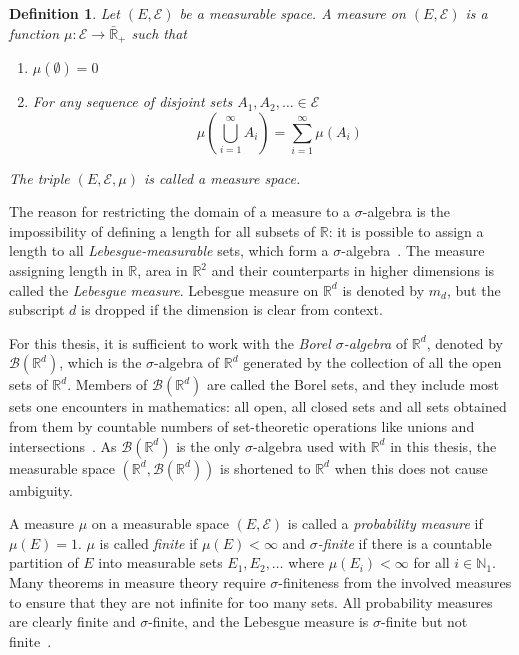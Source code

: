 \documentclass[english,twoside,openright]{HYgraduMLDS}
\newtheorem{definition}[lemma]{Definition}
\newcommand{\R}{\mathbb{R}}
\newcommand{\N}{\mathbb{N}}
\begin{document}
\begin{definition}
	Let \((E, \mathcal{E})\) be a measurable space. A measure on \((E, \mathcal{E})\)
  is a function \(\mu\colon \mathcal{E}\to \bar{\R}_{+}\) such that
  \begin{enumerate}
    \item
    \(\mu(\emptyset) = 0\)
    \item
    For any sequence of disjoint sets \(A_{1}, A_{2},\dotsc \in \mathcal{E}\)
    \[
    \quad \mu\left(\bigcup_{i=1}^{\infty} A_{i}\right)
    = \sum_{i=1}^\infty\mu(A_{i})
    \]
  \end{enumerate}
  The triple \((E, \mathcal{E}, \mu)\) is called a measure space.
\end{definition}

The reason for restricting the domain of a measure to a \(\sigma\)-algebra
is the impossibility of defining a length for all subsets of \(\R\): it is
possible to assign a length to all \emph{Lebesgue-measurable} sets, which form
a \(\sigma\)-algebra~\cite{Cin11}. The measure assigning length in \(\R\),
area in \(\R^{2}\) and their counterparts in higher dimensions is called the
\emph{Lebesgue measure}. Lebesgue measure on \(\R^{d}\) is denoted by
\(m_{d}\), but the subscript \(d\) is dropped if the dimension is clear
from context.

For this thesis, it is sufficient to
work with the \emph{Borel \(\sigma\)-algebra} of \(\R^{d}\), denoted by
\(\mathcal{B}(\R^{d})\), which is
the \(\sigma\)-algebra of \(\R^{d}\) generated by the collection of all the open sets
of \(\R^{d}\). Members of \(\mathcal{B}(\R^{d})\) are called the Borel sets,
and they include most sets one encounters in mathematics: all open, all closed
sets and all sets obtained from them by countable numbers of set-theoretic
operations like unions and intersections~\cite{Cin11}. As \(\mathcal{B}(\R^{d})\) is the
only \(\sigma\)-algebra used with \(\R^{d}\) in this thesis, the measurable space
\((\R^{d}, \mathcal{B}(\R^{d}))\) is shortened to \(\R^{d}\) when this does not
cause ambiguity.

A measure \(\mu\) on a measurable space \((E, \mathcal{E})\) is called
a \emph{probability measure} if \(\mu(E) = 1\). \(\mu\) is called \emph{finite}
if \(\mu(E) < \infty\) and
\emph{\(\sigma\)-finite} if there is a countable partition of \(E\)
into measurable sets \(E_{1}, E_{2},\dotsc\) where \(\mu(E_{i}) < \infty\)
for all \(i\in \N_{1}\).
Many theorems in measure theory require \(\sigma\)-finiteness from the involved
measures to ensure that they are not infinite for too many sets.
All probability measures are clearly finite and \(\sigma\)-finite,
and the Lebesgue measure is \(\sigma\)-finite but not finite~\cite{Cin11}.
\end{document}
